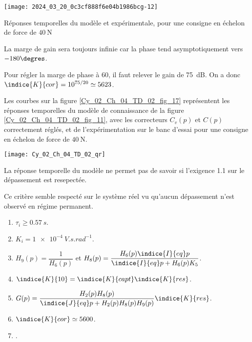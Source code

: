 \begin{marginfigure}%
\texttt{[image: 2024\_03\_20\_0c3cf888f6e04b1986bcg-12]}
\caption{Réponses temporelles du modèle et expérimentale, pour une consigne en échelon de force de $40 \mathrm{~N}$ \label{Cy_02_Ch_04_TD_02_fig_17}}
\end{marginfigure}
\fi

\ifprof
\begin{corrige}
La marge de gain sera toujours infinie car la phase tend asymptotiquement vers $-180\degres$.

Pour régler la marge de phase à 60\degres, il faut relever le gain de \SI{75}{dB}. On a donc $\indice{K}{cor}  =10^{75/20} \simeq  5623$.
\end{corrige}
\else
\fi



\ifprof
\else
Les courbes sur la figure \ref{Cy_02_Ch_04_TD_02_fig_17} représentent les réponses temporelles du modèle de connaissance de la figure \ref{Cy_02_Ch_04_TD_02_fig_11}, avec les correcteurs $C_{v}(p)$ et $C(p)$ correctement réglés, et de l'expérimentation sur le banc d'essai pour une consigne en échelon de force de $40 \mathrm{~N}$.
\fi


\ifprof
\else
\begin{marginfigure}
\centering
\texttt{[image: Cy\_02\_Ch\_04\_TD\_02\_qr]}
\end{marginfigure}
\fi


\ifprof
\begin{corrige}
La réponse temporelle du modèle ne permet pas de savoir si l'exigence 1.1 sur le dépassement est resepectée. 

Ce critère semble respecté sur le système réel vu qu'aucun dépassement n'est observé en régime permanent. 
\end{corrige}
\else
\fi
\ifprof
\else
\begin{solution}
\begin{enumerate}
\item $\tau_i \geq \SI{0,57}{s}$.
\item $K_i = \SI{1e-4}{V.s.rad^{-1}}$.
\item $H_9(p)=\dfrac{1}{H_6(p)}$ et $H_8(p)=\dfrac{H_6(p) \indice{I}{eq}p}{\indice{I}{eq}p+H_6(p) K_5 }$.
\item $\indice{K}{10} = \indice{K}{capt}\indice{K}{res}$.
\item $G(p) = \dfrac{H_2(p)H_8(p)}{\indice{J}{eq}p+H_2(p)H_8(p)H_9(p)}\indice{K}{res}$.
\item $\indice{K}{cor}\simeq 5600$.
\item .
\end{enumerate}
\end{solution}
\fi
